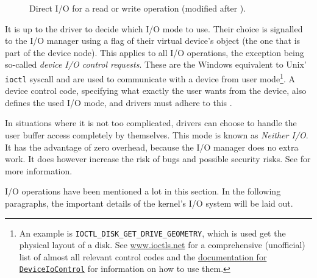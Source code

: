 \begin{figure}[htb!]
	\caption[
		Direct I/O for a read or write operation
	]{
		Direct I/O for a read or write operation (modified after \cite{Yosifovich2017}).
	}
	\label{fig:background.kerneldriver.directio}
\end{figure}

It is up to the driver to decide which I/O mode to use. Their choice is signalled to the I/O manager using a flag of their virtual device's object (the one that is part of the device node). This applies to all I/O operations, the exception being so-called \emph{device I/O control requests}. These are the Windows equivalent to Unix' \texttt{ioctl} syscall and are used to communicate with a device from user mode\footnote{\label{fn:background.kerneldriver.ioctls} An example is \texttt{IOCTL\_DISK\_GET\_DRIVE\_GEOMETRY}, which is used get the physical layout of a disk. See \url{www.ioctls.net} for a comprehensive (unofficial) list of almost all relevant control codes and the \href{https://docs.microsoft.com/en-us/windows/win32/api/ioapiset/nf-ioapiset-deviceiocontrol}{documentation for \texttt{DeviceIoControl}} for information on how to use them.}. A device control code, specifying what exactly the user wants from the device, also defines the used I/O mode, and drivers must adhere to this \cite{Yosifovich2017}.

In situations where it is not too complicated, drivers can choose to handle the user buffer access completely by themselves. This mode is known as \emph{Neither I/O}. It has the advantage of zero overhead, because the I/O manager does no extra work. It does however increase the risk of bugs and possible security risks. See \cite{Yosifovich2017} for more information.

I/O operations have been mentioned a lot in this section. In the following paragraphs, the important details of the kernel's I/O system will be laid out.

